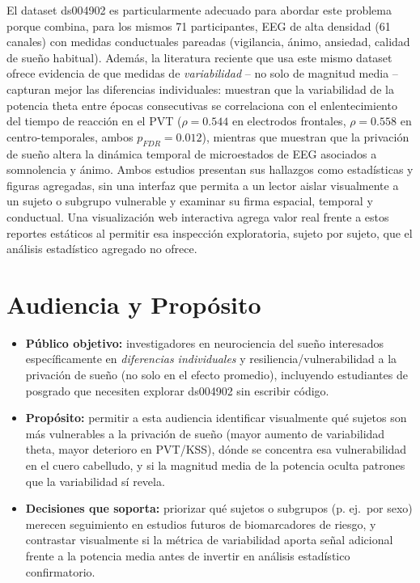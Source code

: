 \documentclass[10pt]{article}
\begin{document}
El dataset ds004902 es particularmente adecuado para abordar este problema porque combina, para los mismos 71 participantes, EEG de alta densidad (61 canales) con medidas conductuales pareadas (vigilancia, ánimo, ansiedad, calidad de sueño habitual). Además, la literatura reciente que usa este mismo dataset ofrece evidencia de que medidas de \emph{variabilidad} -- no solo de magnitud media -- capturan mejor las diferencias individuales: \citet{cui2026} muestran que la variabilidad de la potencia theta entre épocas consecutivas se correlaciona con el enlentecimiento del tiempo de reacción en el PVT ($\rho=0.544$ en electrodos frontales, $\rho=0.558$ en centro-temporales, ambos $p_{FDR}=0.012$), mientras que \citet{bai2025} muestran que la privación de sueño altera la dinámica temporal de microestados de EEG asociados a somnolencia y ánimo. Ambos estudios presentan sus hallazgos como estadísticas y figuras agregadas, sin una interfaz que permita a un lector aislar visualmente a un sujeto o subgrupo vulnerable y examinar su firma espacial, temporal y conductual. Una visualización web interactiva agrega valor real frente a estos reportes estáticos al permitir esa inspección exploratoria, sujeto por sujeto, que el análisis estadístico agregado no ofrece.

\section{Audiencia y Propósito}
\begin{itemize}
    \item \textbf{Público objetivo:} investigadores en neurociencia del sueño interesados específicamente en \emph{diferencias individuales} y resiliencia/vulnerabilidad a la privación de sueño (no solo en el efecto promedio), incluyendo estudiantes de posgrado que necesiten explorar ds004902 sin escribir código.
    \item \textbf{Propósito:} permitir a esta audiencia identificar visualmente qué sujetos son más vulnerables a la privación de sueño (mayor aumento de variabilidad theta, mayor deterioro en PVT/KSS), dónde se concentra esa vulnerabilidad en el cuero cabelludo, y si la magnitud media de la potencia oculta patrones que la variabilidad sí revela.
    \item \textbf{Decisiones que soporta:} priorizar qué sujetos o subgrupos (p. ej.\ por sexo) merecen seguimiento en estudios futuros de biomarcadores de riesgo, y contrastar visualmente si la métrica de variabilidad aporta señal adicional frente a la potencia media antes de invertir en análisis estadístico confirmatorio.
\end{itemize}
\end{document}
